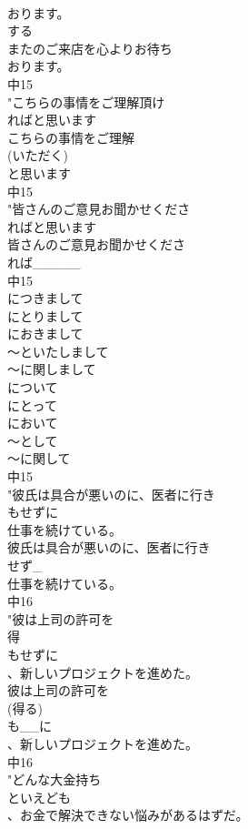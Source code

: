 \documentclass[8pt]{extreport}
\begin{document}
\begin{CJK}{UTF8}{min}
\\	おります。
\\	する 
\\	またのご来店を心よりお待ち
\\	おります。
\\	中15
\\	"こちらの事情をご理解頂け
\\	ればと思います
\\	こちらの事情をご理解
\\	(いただく)
\\	と思います
\\	中15
\\	"皆さんのご意見お聞かせくださ
\\	ればと思います
\\	皆さんのご意見お聞かせくださ
\\	れば_____
\\	中15
\\	につきまして
\\	にとりまして
\\	におきまして
\\	～といたしまして
\\	～に関しまして
\\	について
\\	にとって
\\	において
\\	～として
\\	～に関して
\\	中15
\\	"彼氏は具合が悪いのに、医者に行き
\\	もせずに
\\	仕事を続けている。
\\	彼氏は具合が悪いのに、医者に行き
\\	せず_
\\	仕事を続けている。
\\	中16
\\	"彼は上司の許可を
\\	得
\\	もせずに
\\	、新しいプロジェクトを進めた。
\\	彼は上司の許可を
\\	(得る)
\\	も__に
\\	、新しいプロジェクトを進めた。
\\	中16
\\	"どんな大金持ち
\\	といえども
\\	、お金で解決できない悩みがあるはずだ。

\end{CJK}
\end{document}

